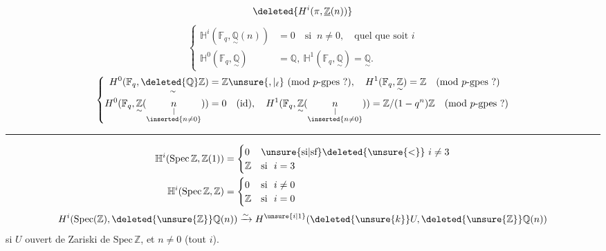 \[
\deleted{H^i(\pi,\underline{\mathbb{Z}}(n))}
\]
\[
\left\{\begin{aligned}
\mathbb{H}^i(\mathbb{F}_q,\underset{\sim}{\mathbb{Q}}(n))&=0\quad\text{si }\ n\ne0,\quad\text{quel que soit }i\\
\mathbb{H}^0(\mathbb{F}_q,\underset{\sim}{\mathbb{Q}})&=\mathbb{Q},\ \mathbb{H}^1(\mathbb{F}_q,\underset{\sim}{\mathbb{Q}})=\underset{\sim}{\mathbb{Q}}.
\end{aligned}\right.
\]
\[
\left\{\begin{aligned}
H^0(\mathbb{F}_q,\underset{\sim}{\deleted{\mathbb{Q}}\mathbb{Z}})&=\mathbb{Z}\unsure{,|{}_\ell}\ (\text{mod }p\text{-gpes }?),\quad H^1(\mathbb{F}_q,\underset{\sim}{\mathbb{Z}})=\mathbb{Z}\quad(\text{mod }p\text{-gpes }?)\\
H^0(\mathbb{F}_q,\underset{\sim}{\mathbb{Z}}(\underset{\substack{\vert\\\inserted{n\ne0}}}{n}))&=0\quad(\text{id}),\quad H^1(\mathbb{F}_q,\underset{\sim}{\mathbb{Z}}(\underset{\substack{\vert\\\inserted{n\ne0}}}{n}))=\mathbb{Z}/(1-q^n)\mathbb{Z}\quad(\text{mod }p\text{-gpes }?)
\end{aligned}\right.
\]

\noindent\rule{.76\linewidth}{.35pt}
\[
\begin{aligned}
\mathbb{H}^i(\mathrm{Spec}\,\mathbb{Z},\mathbb{Z}(1))&=\begin{cases}0&\text{\unsure{si|sf}}\deleted{\unsure{<}}\ i\ne3\\\mathbb{Z}&\text{si }\ i=3\end{cases}\\
\mathbb{H}^i(\mathrm{Spec}\,\mathbb{Z},\mathbb{Z})&=\begin{cases}0&\text{si }\ i\ne0\\\mathbb{Z}&\text{si }\ i=0\end{cases}
\end{aligned}
\]
\[
H^i(\mathrm{Spec}(\mathbb{Z}),\deleted{\unsure{\mathbb{Z}}}\mathbb{Q}(n))\xrightarrow{\sim} H^{\unsure{i|1}}(\deleted{\unsure{k}}U,\deleted{\unsure{\mathbb{Z}}}\mathbb{Q}(n))
\]
si $U$ ouvert de Zariski de $\mathrm{Spec}\,\mathbb{Z}$, et $n\ne0$ (tout $i$).

